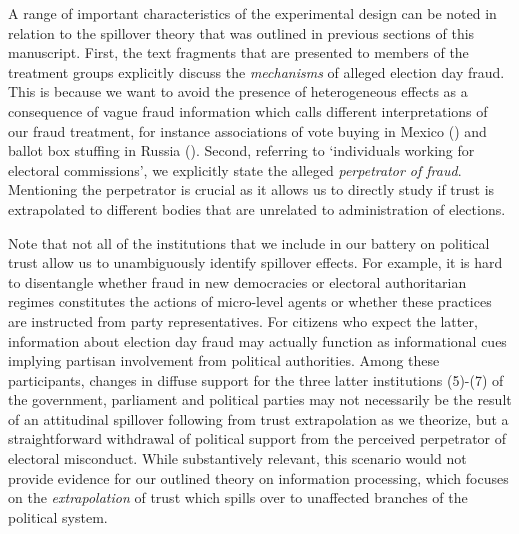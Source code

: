 \documentclass[11pt, ngerman,english,a4]{article}
\begin{document}
A range of important characteristics of the experimental design can be noted in relation to the spillover theory that was outlined in previous sections of this manuscript. First, the text fragments that are presented to members of the treatment groups explicitly discuss the \textit{mechanisms} of alleged election day fraud. This is because we want to avoid the presence of heterogeneous effects as a consequence of vague fraud information which calls different interpretations of our fraud treatment, for instance associations of vote buying in Mexico (\citealt{Cantu2019a}) and ballot box stuffing in Russia (\citealt{Myagkov2009}). Second, referring to `individuals working for electoral commissions’, we explicitly state the alleged \textit{perpetrator of fraud}. Mentioning the perpetrator is crucial as it allows us to directly study if trust is extrapolated to different bodies that are unrelated to administration of elections. 

Note that not all of the institutions that we include in our battery on political trust allow us to unambiguously identify spillover effects. For example, it is hard to disentangle whether fraud in new democracies or electoral authoritarian regimes constitutes the actions of micro-level agents or whether these practices are instructed from party representatives. For citizens who expect the latter, information about election day fraud may actually function as informational cues implying partisan involvement from political authorities. Among these participants, changes in diffuse support for the three latter institutions (5)-(7) of the government, parliament and political parties may not necessarily be the result of an attitudinal spillover following from trust extrapolation as we theorize, but a straightforward withdrawal of political support from the perceived perpetrator of electoral misconduct. While substantively relevant, this scenario would not provide evidence for our outlined theory on information processing, which focuses on the \textit{extrapolation} of trust which spills over to unaffected branches of the political system.
\end{document}
